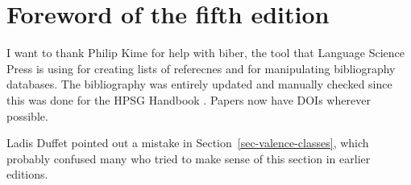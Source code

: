 
\section*{Foreword of the fifth edition}

I want to thank Philip Kime for help with biber, the tool that Language Science Press is using for
creating lists of referecnes and for manipulating bibliography databases. The bibliography was
entirely updated and manually checked since this was done for the HPSG Handbook \citep*{HPSGHandbook}. Papers
now have DOIs wherever possible.

Ladis Duffet pointed out a mistake in Section~\ref{sec-valence-classes}, which probably confused many who tried to make
sense of this section in earlier editions.










%
%
%

